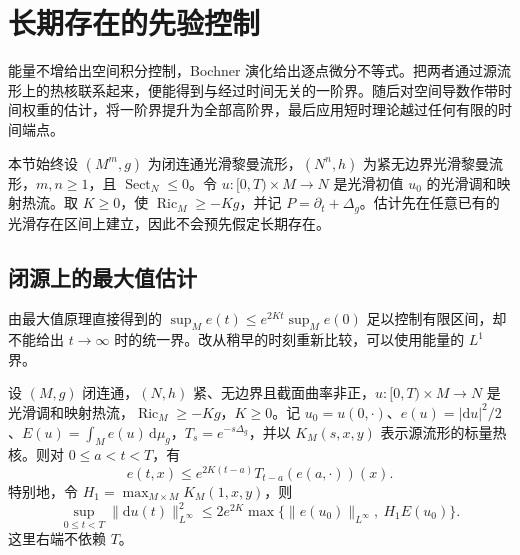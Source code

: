 
% 
% 

\section{长期存在的先验控制}
\label{g3:sec:2604}

能量不增给出空间积分控制，Bochner 演化给出逐点微分不等式。把两者通过源流形上的热核联系起来，便能得到与经过时间无关的一阶界。随后对空间导数作带时间权重的估计，将一阶界提升为全部高阶界，最后应用短时理论越过任何有限的时间端点。

本节始终设 \((M^m,g)\) 为闭连通光滑黎曼流形，\((N^n,h)\) 为紧无边界光滑黎曼流形，\(m,n\ge1\)，且 \(\operatorname{Sect}_N\le0\)。令 \(u:[0,T)\times M\to N\) 是光滑初值 \(u_0\) 的光滑调和映射热流。取 \(K\ge0\)，使 \(\operatorname{Ric}_M\ge-Kg\)，并记 \(P=\partial_t+\Delta_g\)。估计先在任意已有的光滑存在区间上建立，因此不会预先假定长期存在。

\subsection{闭源上的最大值估计}
\label{g3:subsec:2604:01}
由最大值原理直接得到的 \(\sup_M e(t)\le e^{2Kt}\sup_M e(0)\) 足以控制有限区间，却不能给出 \(t\to\infty\) 时的统一界。改从稍早的时刻重新比较，可以使用能量的 \(L^1\) 界。

\begin{proposition}\label{g3:prop:harmonic-heat-uniform-gradient}
	设 \((M,g)\) 闭连通，\((N,h)\) 紧、无边界且截面曲率非正，\(u:[0,T)\times M\to N\) 是光滑调和映射热流，\(\operatorname{Ric}_M\ge-Kg\)，\(K\ge0\)。记 \(u_0=u(0,\cdot)\)、\(e(u)=|\mathrm du|^2/2\)、\(E(u)=\int_Me(u)\,\mathrm d\mu_g\)，\(T_s=e^{-s\Delta_g}\)，并以 \(K_M(s,x,y)\) 表示源流形的标量热核。则对 \(0\le a<t<T\)，有
	\begin{equation}\label{g3:eq:harmonic-heat-kernel-comparison}
		e(t,x)\le e^{2K(t-a)}T_{t-a}(e(a,\cdot))(x).
	\end{equation}
	特别地，令 \(H_1=\max_{M\times M}K_M(1,x,y)\)，则
	\begin{equation}\label{g3:eq:harmonic-heat-gradient-uniform}
		\sup_{0\le t<T}\|\mathrm du(t)\|_{L^\infty}^2
		\le 2e^{2K}\max\{\|e(u_0)\|_{L^\infty},\ H_1E(u_0)\}.
	\end{equation}
	这里右端不依赖 \(T\)。
\end{proposition}

